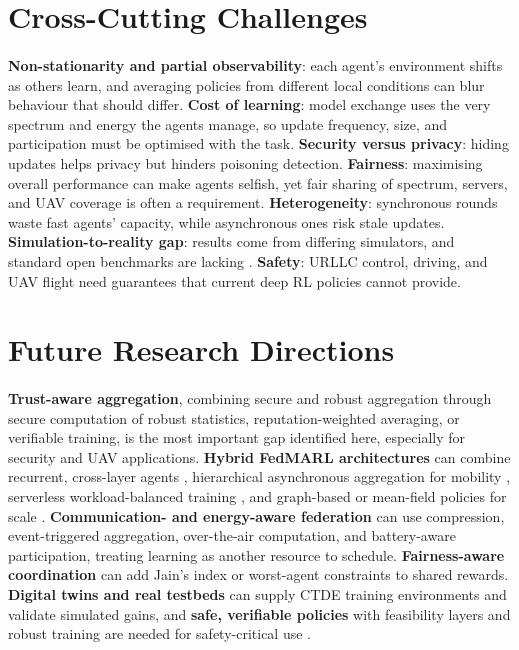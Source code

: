 \documentclass[12pt,a4paper,final]{extreport}
\begin{document}
\section{Cross-Cutting Challenges}

\paragraph{} \textbf{Non-stationarity and partial observability}: each agent's environment shifts as others learn, and averaging policies from different local conditions can blur behaviour that should differ. \textbf{Cost of learning}: model exchange uses the very spectrum and energy the agents manage, so update frequency, size, and participation must be optimised with the task. \textbf{Security versus privacy}: hiding updates helps privacy but hinders poisoning detection. \textbf{Fairness}: maximising overall performance can make agents selfish, yet fair sharing of spectrum, servers, and UAV coverage is often a requirement. \textbf{Heterogeneity}: synchronous rounds waste fast agents' capacity, while asynchronous ones risk stale updates. \textbf{Simulation-to-reality gap}: results come from differing simulators, and standard open benchmarks are lacking \cite{p3}. \textbf{Safety}: URLLC control, driving, and UAV flight need guarantees that current deep RL policies cannot provide.

\section{Future Research Directions}

\paragraph{} \textbf{Trust-aware aggregation}, combining secure and robust aggregation through secure computation of robust statistics, reputation-weighted averaging, or verifiable training, is the most important gap identified here, especially for security and UAV applications. \textbf{Hybrid FedMARL architectures} can combine recurrent, cross-layer agents \cite{p2}, hierarchical asynchronous aggregation for mobility \cite{p1}, serverless workload-balanced training \cite{p4}, and graph-based or mean-field policies for scale \cite{p3}. \textbf{Communication- and energy-aware federation} can use compression, event-triggered aggregation, over-the-air computation, and battery-aware participation, treating learning as another resource to schedule. \textbf{Fairness-aware coordination} can add Jain's index or worst-agent constraints to shared rewards. \textbf{Digital twins and real testbeds} can supply CTDE training environments and validate simulated gains, and \textbf{safe, verifiable policies} with feasibility layers and robust training are needed for safety-critical use \cite{p3}.
\end{document}
